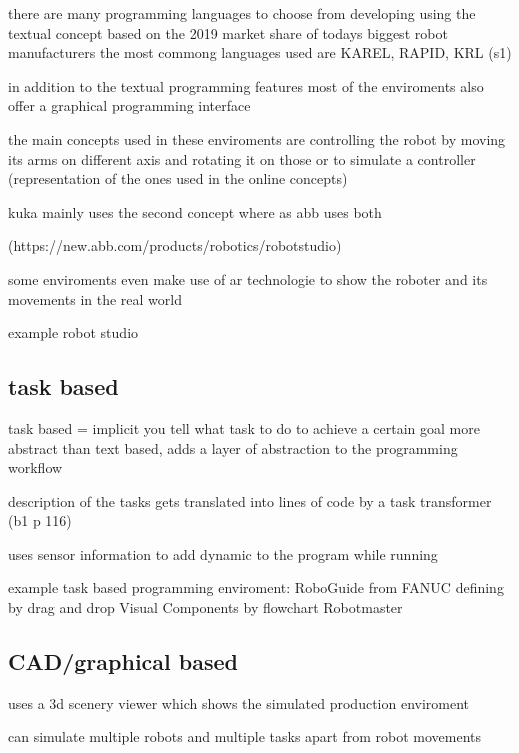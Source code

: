 \documentclass[conference]{IEEEtran}
\begin{document}
        there are many programming languages to choose from developing using the textual concept
        based on the 2019 market share of todays biggest robot manufacturers the most commong languages used are KAREL, RAPID, KRL
        (s1)

        in addition to the textual programming features most of the enviroments also offer a graphical programming interface

        the main concepts used in these enviroments are controlling the robot by moving its arms on different axis and rotating it on those or to simulate a controller (representation of the ones used in the online concepts)

        kuka mainly uses the second concept where as abb uses both

        (https://new.abb.com/products/robotics/robotstudio)

        some enviroments even make use of ar technologie to show the roboter and its movements in the real world
        
        example robot studio

         

    
    \subsection{task based}

        task based = implicit
        you tell what task to do to achieve a certain goal
        more abstract than text based, adds a layer of abstraction to the programming workflow

        description of the tasks gets translated into lines of code by a task transformer (b1 p 116)

        uses sensor information to add dynamic to the program while running

        example task based programming enviroment:
        RoboGuide from FANUC defining by drag and drop
        Visual Components by flowchart
        Robotmaster 

    \subsection{CAD/graphical based}

        uses a 3d scenery viewer which shows the simulated production enviroment

        can simulate multiple robots and multiple tasks apart from robot movements
\end{document}
